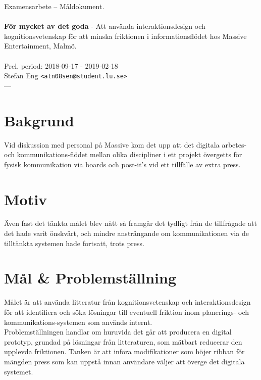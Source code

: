 \documentclass{article}
\begin{document}
\begin{center}

  Examensarbete -- Måldokument. \\
  \ \\
  {\large
    \textbf{För mycket av det goda} -
    Att använda interaktionsdesign och kognitionsvetenskap för
    att minska friktionen i informationsflödet hos Massive
    Entertainment, Malmö. \\
  }
  \ \\
  Prel. period: 2018-09-17 - 2019-02-18\\
  Stefan Eng \texttt{<atn08sen@student.lu.se>}
  \ \\
  ---
  \vspace{-0.3cm}

\end{center}

\section*{Bakgrund}

  Vid diskussion med personal på Massive kom det upp att det digitala
  arbetes- och kommunikations-flödet mellan olika discipliner i ett
  projekt övergetts för fysisk kommunikation via boards och post-it's  vid ett
  tillfälle av extra press.

\section*{Motiv}

  Även fast det tänkta målet blev nått så framgår det tydligt från de
  tillfrågade att det hade varit önskvärt, och mindre ansträngande om
  kommunikationen via de tilltänkta systemen hade fortsatt, trots press.

\section*{Mål \& Problemställning}

  Målet är att använda litteratur från kognitionsvetenskap och interaktionsdesign
  för att identifiera och söka lösningar till eventuell friktion inom
  planerings- och kommunikations-systemen som används internt. \\

  Problemställningen handlar om huruvida det går att producera en
  digital prototyp, grundad på lösningar från litteraturen, som mätbart
  reducerar den upplevda friktionen. Tanken är att införa modifikationer som
  höjer ribban för mängden press som kan uppstå innan användare väljer att
  överge det digitala systemet.
\end{document}
